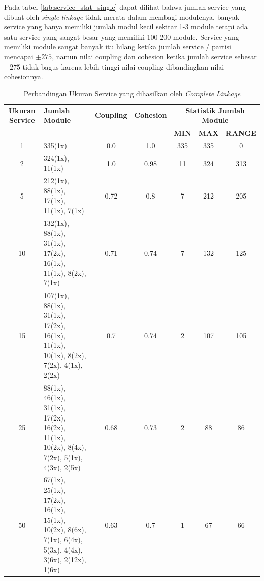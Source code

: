 Pada tabel \ref{tab:service_stat_single} dapat dilihat bahwa jumlah service yang dibuat oleh \textit{single} \textit{linkage} tidak merata dalam membagi modulenya, banyak service yang hanya memiliki jumlah modul kecil sekitar 1-3 module tetapi ada satu service yang sangat besar yang memiliki 100-200 module. Service yang memiliki module sangat banyak itu hilang ketika jumlah service / partisi mencapai $\pm 275$, namun nilai coupling dan cohesion ketika jumlah service sebesar $\pm 275$ tidak bagus karena lebih tinggi nilai coupling dibandingkan nilai cohesionnya.


\begingroup
\setlength{\LTleft}{-20cm plus -1fill}
\setlength{\LTright}{\LTleft}
\begin{small}
\begin{longtable}{|c|p{4cm}|c|c|c|c|c|}
		\caption{Perbandingan Ukuran Service yang dihasilkan oleh \textit{Complete} \textit{Linkage}}
		\label{tab:service_stat_complete} \\
		\hline
		\textbf{Ukuran Service} & \textbf{Jumlah Module} & \textbf{Coupling} & \textbf{Cohesion} & \multicolumn{3}{c|}{\textbf{Statistik Jumlah Module}} \\
		\cline{5-7}
		&  &  &  & \textbf{MIN} & \textbf{MAX} & \textbf{RANGE} \\
		\hline
		\endfirsthead
		\hline  
		1 & 335(1x) & \cellcolor{colorGood}  0.0 & \cellcolor{colorGood} 1.0 & 335 & 335 & \cellcolor{colorGood} 0 \\   \hline
2 & 324(1x), 11(1x) & \cellcolor{colorBad}  1.0 & \cellcolor{colorBad} 0.98 & 11 & 324 & \cellcolor{colorBad} 313 \\   \hline
5 & 212(1x), 88(1x), 17(1x), 11(1x), 7(1x) & \cellcolor{colorOK}  0.72 & \cellcolor{colorOK} 0.8 & 7 & 212 & \cellcolor{colorBad} 205 \\   \hline
10 & 132(1x), 88(1x), 31(1x), 17(2x), 16(1x), 11(1x), 8(2x), 7(1x) & \cellcolor{colorOK}  0.71 & \cellcolor{colorOK} 0.74 & 7 & 132 & \cellcolor{colorBad} 125 \\   \hline
15 & 107(1x), 88(1x), 31(1x), 17(2x), 16(1x), 11(1x), 10(1x), 8(2x), 7(2x), 4(1x), 2(2x) & \cellcolor{colorOK}  0.7 & \cellcolor{colorOK} 0.74 & 2 & 107 & \cellcolor{colorBad} 105 \\   \hline
25 & 88(1x), 46(1x), 31(1x), 17(2x), 16(2x), 11(1x), 10(2x), 8(4x), 7(2x), 5(1x), 4(3x), 2(5x) & \cellcolor{colorOK}  0.68 & \cellcolor{colorOK} 0.73 & 2 & 88 & \cellcolor{colorBad} 86 \\   \hline
50 & 67(1x), 25(1x), 17(2x), 16(1x), 15(1x), 10(2x), 8(6x), 7(1x), 6(4x), 5(3x), 4(4x), 3(6x), 2(12x), 1(6x) & \cellcolor{colorOK}  0.63 & \cellcolor{colorOK} 0.7 & 1 & 67 & \cellcolor{colorBad} 66 \\   \hline

\end{longtable}
\end{small}

